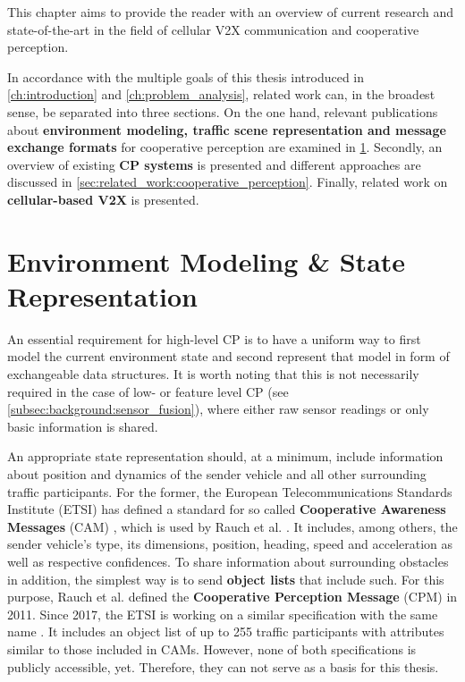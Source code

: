 This chapter aims to provide the reader with an overview of current research and state-of-the-art in the field of cellular V2X communication and cooperative perception.
\par
\bigskip

In accordance with the multiple goals of this thesis introduced in \cref{ch:introduction} and \cref{ch:problem_analysis}, related work can, in the broadest sense, be separated into three sections. On the one hand, relevant publications about \textbf{environment modeling, traffic scene representation and message exchange formats} for cooperative perception are examined in \cref{sec:related_work:environment_modeling_state_representation}. Secondly, an overview of existing \textbf{CP systems} is presented and different approaches are discussed in \cref{sec:related_work:cooperative_perception}. Finally, related work on \textbf{cellular-based V2X} is presented.

\section{Environment Modeling \& State Representation}
\label{sec:related_work:environment_modeling_state_representation}
An essential requirement for high-level CP is to have a uniform way to first model the current environment state and second represent that model in form of exchangeable data structures. It is worth noting that this is not necessarily required in the case of low- or feature level CP (see \cref{subsec:background:sensor_fusion}), where either raw sensor readings or only basic information is shared.

An appropriate state representation should, at a minimum, include information about position and dynamics of the sender vehicle and all other surrounding traffic participants. For the former, the European Telecommunications Standards Institute (ETSI) has defined a standard for so called \textbf{Cooperative Awareness Messages} (CAM) \cite{EuropeanTelecommunicationsStandardsInstituteETSI2011}, which is used by Rauch et al. \cite{Rauch2011}. It includes, among others, the sender vehicle's type, its dimensions, position, heading, speed and acceleration as well as respective confidences. To share information about surrounding obstacles in addition, the simplest way is to send \textbf{object lists} that include such. For this purpose, Rauch et al. \cite{Rauch2011} defined the \textbf{Cooperative Perception Message} (CPM) in 2011. Since 2017, the ETSI is working on a similar specification with the same name \cite{EuropeanTelecommunicationsStandardsInstituteETSI2019}. It includes an object list of up to 255 traffic participants \cite{Thandavarayan2019} with attributes similar to those included in CAMs. However, none of both specifications is publicly accessible, yet. Therefore, they can not serve as a basis for this thesis.

